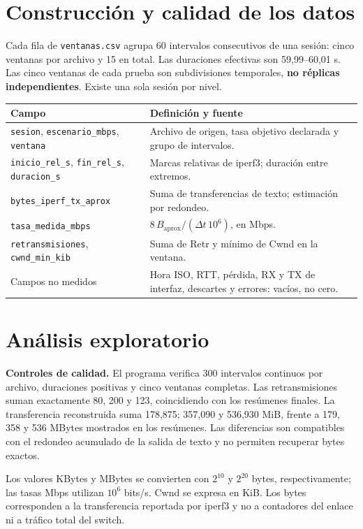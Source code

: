 \documentclass[11pt,letterpaper]{article}
\newcommand{\cod}[1]{\texttt{#1}}
\begin{document}
\section{Construcción y calidad de los datos}
Cada fila de \cod{ventanas.csv} agrupa 60 intervalos consecutivos de una sesión: cinco ventanas por archivo y 15 en total. Las duraciones efectivas son 59,99--60,01 s. Las cinco ventanas de cada prueba son subdivisiones temporales, \textbf{no réplicas independientes}. Existe una sola sesión por nivel.

{\small
\begin{tabularx}{\textwidth}{p{4.5cm} L}
\toprule Campo & Definición y fuente\\ \midrule
\cod{sesion}, \cod{escenario\_mbps}, \cod{ventana} & Archivo de origen, tasa objetivo declarada y grupo de intervalos.\\
\cod{inicio\_rel\_s}, \cod{fin\_rel\_s}, \cod{duracion\_s} & Marcas relativas de iperf3; duración entre extremos.\\
\cod{bytes\_iperf\_tx\_aprox} & Suma de transferencias de texto; estimación por redondeo.\\
\cod{tasa\_medida\_mbps} & $8\,B_{\mathrm{aprox}}/(\Delta t\,10^6)$, en Mbps.\\
\cod{retransmisiones}, \cod{cwnd\_min\_kib} & Suma de Retr y mínimo de Cwnd en la ventana.\\
Campos no medidos & Hora ISO, RTT, pérdida, RX y TX de interfaz, descartes y errores: vacíos, no cero.\\
\bottomrule
\end{tabularx}}

\newpage
\section{Análisis exploratorio}
\textbf{Controles de calidad.} El programa verifica 300 intervalos continuos por archivo, duraciones positivas y cinco ventanas completas. Las retransmisiones suman exactamente 80, 200 y 123, coincidiendo con los resúmenes finales. La transferencia reconstruida suma 178,875; 357,090 y 536,930 MiB, frente a 179, 358 y 536 MBytes mostrados en los resúmenes. Las diferencias son compatibles con el redondeo acumulado de la salida de texto y no permiten recuperar bytes exactos.

Los valores KBytes y MBytes se convierten con $2^{10}$ y $2^{20}$ bytes, respectivamente; las tasas Mbps utilizan $10^6$ bits/s. Cwnd se expresa en KiB. Los bytes corresponden a la transferencia reportada por iperf3 y no a contadores del enlace ni a tráfico total del switch.
\end{document}
